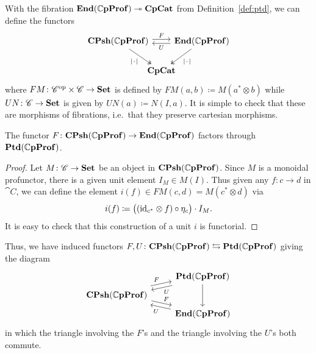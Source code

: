 \documentclass[11pt,oneside,article]{memoir}
\begin{document}
With the fibration $\mathbf{End}(\mathbb{C}\mathbf{pProf})\twoheadrightarrow\mathbf{CpCat}$ from Definition~\ref{def:ptd}, we can define the functors
\begin{equation} \begin{tikzcd}[column sep=-1em]
   \label{eqn:functors_1C_CC}
   \CPsh(\dCompProf) \ar[rr,shift left,"F"] \ar[dr,two heads,"\MOb"']
   && \End(\dCompProf) \ar[ll,shift left,"U"] \ar[dl,two heads,"\MOb"] \\
   & \CompCat &
\end{tikzcd} \end{equation}
where $FM\colon{\mathscr{C}}^{\text{op}}\times \mathscr{C}\to\mathbf{Set}$ is defined by $FM(a,b)\coloneqq M(a^*\otimes b)$ while $UN\colon \mathscr{C}\to\mathbf{Set}$ is given by $UN(a)\coloneqq N(I,a)$. It is simple to check that these are morphisms of fibrations, i.e.\ that they preserve cartesian morphisms.

\begin{proposition}
      \label{Prop:canonical unit}
   The functor $F\colon\mathbf{CPsh}(\mathbb{C}\mathbf{pProf})\to\mathbf{End}(\mathbb{C}\mathbf{pProf})$ factors through $\mathbf{Ptd}(\mathbb{C}\mathbf{pProf})$.
\end{proposition}
\begin{proof}
   Let $M\colon \mathscr{C}\to\mathbf{Set}$ be an object in $\mathbf{CPsh}(\mathbb{C}\mathbf{pProf})$. Since $M$ is a monoidal profunctor, there is a given unit element $I_M\in M(I)$. Thus given any $f\colon c\to d$ in $ \cat{C}$, we can define the element $i(f)\in FM(c,d)=M(c^*\otimes d)$ via
   \[i(f)\coloneqq\big((\mathrm{id}_{c^*}\otimes f)\circ\eta_c\big)\cdot I_M.\]
   It is easy to check that this construction of a unit $i$ is functorial.
\end{proof}

Thus, we have induced functors $F,U\colon\mathbf{CPsh}(\mathbb{C}\mathbf{pProf})\leftrightarrows\mathbf{Ptd}(\mathbb{C}\mathbf{pProf})$ giving the diagram
\begin{equation} \begin{tikzcd}[row sep=tiny]
      \label{eqn:ptd_functors_1C_CC}
   & \Ptd(\dCompProf) \ar[dd] \ar[dl,shift left,"U"] \\
   \CPsh(\dCompProf) \ar[ur,shift left,"F"] \ar[dr,shift left,"F"] & \\
   & \End(\dCompProf) \ar[ul,shift left,"U"]
\end{tikzcd} \end{equation}
in which the triangle involving the $F$'s and the triangle involving the $U$'s both commute.
\end{document}
